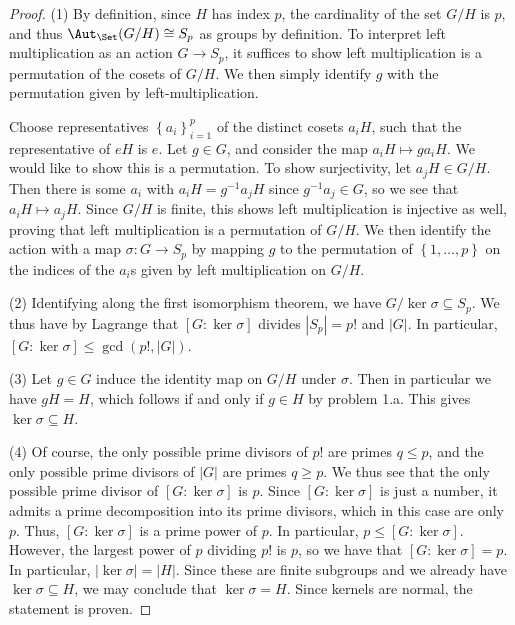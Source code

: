 \documentclass[11pt, letterpaper]{article}
\theoremstyle{plain}
\begin{document}
\begin{proof}
	(1) By definition, since $H$ has index $p$, the cardinality of the set $G/H$ is $p$, and thus $\Aut_{\Set }(G/H) \cong S_p$ as groups by definition. To interpret left multiplication as an action $G\to S_p$, it suffices to show left multiplication is a permutation of the cosets of $G/H$. We then simply identify $g$ with the permutation given by left-multiplication.

	Choose representatives $\left\{ a_i \right\}_{i=1} ^p$ of the distinct cosets $a_iH$, such that the representative of $eH$ is $e$. Let $g\in G$, and consider the map $a_iH\mapsto ga_iH$. We would like to show this is a permutation. To show surjectivity, let $a_jH\in G/H$. Then there is some $a_i$ with $a_iH=g^{-1} a_jH$ since $g^{-1} a_j\in G$, so we see that $a_iH\mapsto a_jH$. Since $G/H$ is finite, this shows left multiplication is injective as well, proving that left multiplication is a permutation of $G/H$. We then identify the action with a map $\sigma : G \to S_p$ by mapping $g$ to the permutation of $\left\{ 1, \ldots ,p \right\} $ on the indices of the $a_i$s given by left multiplication on $G/H$.

	(2) Identifying along the first isomorphism theorem, we have $G/\ker \sigma \subseteq S_p$. We thus have by Lagrange that $[G : \ker \sigma ]$ divides $\left| S_p \right| =p!$ and $\left| G \right| $. In particular, $[G : \ker \sigma ] \leq \operatorname{gcd} (p!,\left| G \right| )$.

	(3) Let $g\in G$ induce the identity map on $G/H$ under $\sigma $. Then in particular we have $gH=H$, which follows if and only if $g\in H$ by problem 1.a. This gives $\ker \sigma \subseteq H$.

	(4) Of course, the only possible prime divisors of $p!$ are primes $q\leq p$, and the only possible prime divisors of $\left| G \right| $ are primes $q\geq p$. We thus see that the only possible prime divisor of $[G : \ker \sigma ]$ is $p$. Since $[G : \ker \sigma ]$ is just a number, it admits a prime decomposition into its prime divisors, which in this case are only $p$. Thus, $[G : \ker \sigma ]$ is a prime power of $p$. In particular, $p\leq [G : \ker \sigma ]$. However, the largest power of $p$ dividing $p!$ is $p$, so we have that $[G : \ker \sigma ]=p$. In particular, $\left| \ker \sigma  \right| =\left| H \right| $. Since these are finite subgroups and we already have $\ker \sigma \subseteq H$, we may conclude that $\ker \sigma =H$. Since kernels are normal, the statement is proven.
\end{proof}
\end{document}
